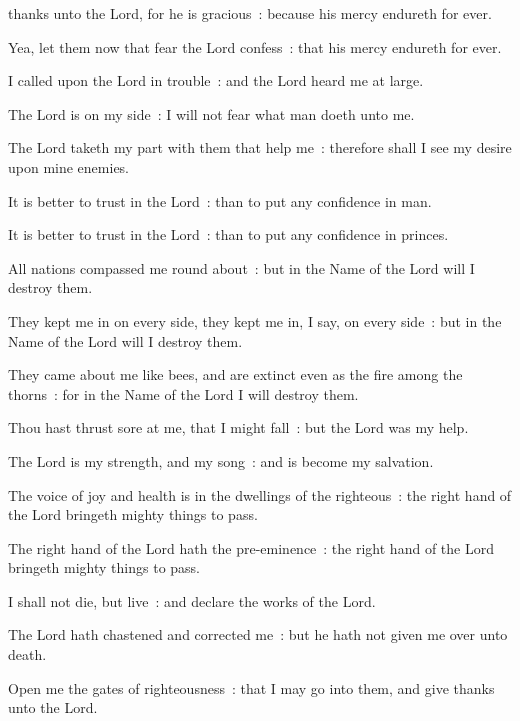  thanks unto the Lord, for he is gracious~: because his mercy endureth for ever.\par
{}
Yea, let them now that fear the Lord confess~: that his mercy endureth for ever.\par
{}I called upon the Lord in trouble~: and the Lord heard me at large.\par
{}The Lord is on my side~: I will not fear what man doeth unto me.\par
{}The Lord taketh my part with them that help me~: therefore shall I see my desire upon mine enemies.\par
{}It is better to trust in the Lord~: than to put any confidence in man.\par
{}It is better to trust in the Lord~: than to put any confidence in princes.\par
{}All nations compassed me round about~: but in the Name of the Lord will I destroy them.\par
{}They kept me in on every side, they kept me in, I say, on every side~: but in the Name of the Lord will I destroy them.\par
{}They came about me like bees, and are extinct even as the fire among the thorns~: for in the Name of the Lord I will destroy them.\par
{}Thou hast thrust sore at me, that I might fall~: but the Lord was my help.\par
{}The Lord is my strength, and my song~: and is become my salvation.\par
{}The voice of joy and health is in the dwellings of the righteous~: the right hand of the Lord bringeth mighty things to pass.\par
{}The right hand of the Lord hath the pre-eminence~: the right hand of the Lord bringeth mighty things to pass.\par
{}I shall not die, but live~: and declare the works of the Lord.\par
{}The Lord hath chastened and corrected me~: but he hath not given me over unto death.\par
{}Open me the gates of righteousness~: that I may go into them, and give thanks unto the Lord.\par
